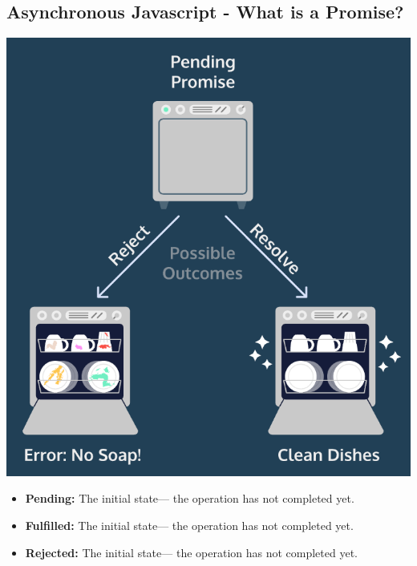 \documentclass[12pt]{article}
\begin{document}
\subsection{Asynchronous Javascript - What is a Promise?}

\begin{center}
\includegraphics[width=0.9\linewidth]{images/tutorial_2.png}
\end{center}

\begin{itemize}
    \item \textbf{Pending:} The initial state— the operation has not completed yet.
    \item \textbf{Fulfilled:} The initial state— the operation has not completed yet.
    \item \textbf{Rejected:} The initial state— the operation has not completed yet.
\end{itemize}
\end{document}
